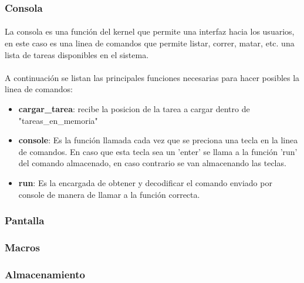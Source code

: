 \documentclass[11pt, a4paper]{article}
\begin{document}
\subsubsection{Consola}

\paragraph{}
La consola es una función del kernel que permite una interfaz hacia los usuarios, en este caso es una linea de comandos que permite listar, correr, matar, etc. una lista de tareas disponibles en el sistema. 
\paragraph{}
A continuación se listan las principales funciones necesarias para hacer posibles la linea de comandos:
\begin{itemize}

\item \textbf{ cargar\_tarea}: recibe la posicion de la tarea a cargar dentro de "tareas\_en\_memoria"

\item \textbf{console}: Es la función llamada cada vez que se preciona una tecla en la linea de comandos. En caso que esta tecla sea un 'enter' se llama a la función 'run' del comando almacenado, en caso contrario se van almacenando las teclas.
\item \textbf{run}: Es la encargada de obtener y decodificar el comando enviado por console de manera de llamar a la función correcta.
\end{itemize}				



\subsubsection{Pantalla}
\subsubsection{Macros}
\subsubsection{Almacenamiento}
\end{document}
